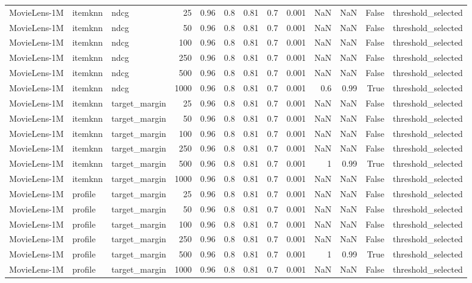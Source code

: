 \begin{table}[t]
{\begin{tabular}{lllrrrrrrrrrl}
MovieLens-1M & itemknn & ndcg & 25 & 0.96 & 0.8 & 0.81 & 0.7 & 0.001 & NaN & NaN & False & threshold\_selected \\
MovieLens-1M & itemknn & ndcg & 50 & 0.96 & 0.8 & 0.81 & 0.7 & 0.001 & NaN & NaN & False & threshold\_selected \\
MovieLens-1M & itemknn & ndcg & 100 & 0.96 & 0.8 & 0.81 & 0.7 & 0.001 & NaN & NaN & False & threshold\_selected \\
MovieLens-1M & itemknn & ndcg & 250 & 0.96 & 0.8 & 0.81 & 0.7 & 0.001 & NaN & NaN & False & threshold\_selected \\
MovieLens-1M & itemknn & ndcg & 500 & 0.96 & 0.8 & 0.81 & 0.7 & 0.001 & NaN & NaN & False & threshold\_selected \\
MovieLens-1M & itemknn & ndcg & 1000 & 0.96 & 0.8 & 0.81 & 0.7 & 0.001 & 0.6 & 0.99 & True & threshold\_selected \\
MovieLens-1M & itemknn & target\_margin & 25 & 0.96 & 0.8 & 0.81 & 0.7 & 0.001 & NaN & NaN & False & threshold\_selected \\
MovieLens-1M & itemknn & target\_margin & 50 & 0.96 & 0.8 & 0.81 & 0.7 & 0.001 & NaN & NaN & False & threshold\_selected \\
MovieLens-1M & itemknn & target\_margin & 100 & 0.96 & 0.8 & 0.81 & 0.7 & 0.001 & NaN & NaN & False & threshold\_selected \\
MovieLens-1M & itemknn & target\_margin & 250 & 0.96 & 0.8 & 0.81 & 0.7 & 0.001 & NaN & NaN & False & threshold\_selected \\
MovieLens-1M & itemknn & target\_margin & 500 & 0.96 & 0.8 & 0.81 & 0.7 & 0.001 & 1 & 0.99 & True & threshold\_selected \\
MovieLens-1M & itemknn & target\_margin & 1000 & 0.96 & 0.8 & 0.81 & 0.7 & 0.001 & NaN & NaN & False & threshold\_selected \\
MovieLens-1M & profile & target\_margin & 25 & 0.96 & 0.8 & 0.81 & 0.7 & 0.001 & NaN & NaN & False & threshold\_selected \\
MovieLens-1M & profile & target\_margin & 50 & 0.96 & 0.8 & 0.81 & 0.7 & 0.001 & NaN & NaN & False & threshold\_selected \\
MovieLens-1M & profile & target\_margin & 100 & 0.96 & 0.8 & 0.81 & 0.7 & 0.001 & NaN & NaN & False & threshold\_selected \\
MovieLens-1M & profile & target\_margin & 250 & 0.96 & 0.8 & 0.81 & 0.7 & 0.001 & NaN & NaN & False & threshold\_selected \\
MovieLens-1M & profile & target\_margin & 500 & 0.96 & 0.8 & 0.81 & 0.7 & 0.001 & 1 & 0.99 & True & threshold\_selected \\
MovieLens-1M & profile & target\_margin & 1000 & 0.96 & 0.8 & 0.81 & 0.7 & 0.001 & NaN & NaN & False & threshold\_selected \\
\bottomrule
\end{tabular}
}
\end{table}
